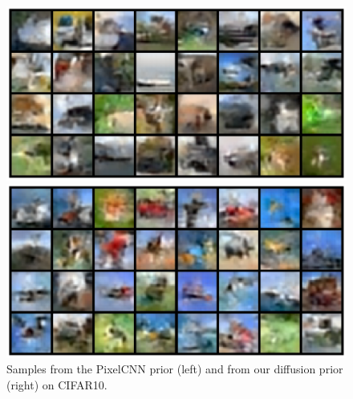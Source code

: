 \documentclass{article}
\theoremstyle{plain}
\theoremstyle{definition}
\theoremstyle{remark}
\begin{document}
\begin{figure}[!htb]
    \centering
    \begin{minipage}[b]{0.4\textwidth}
    \includegraphics[width=1.\linewidth]{./samples_pixel_cifar.pdf}
    \end{minipage}
    \hfill
    \begin{minipage}[b]{0.4\textwidth}
    \includegraphics[width=1.\linewidth]{./samples_cifar.pdf}
    \end{minipage}
        \caption{Samples from the PixelCNN prior (left) and from our diffusion prior (right) on CIFAR10.}
        
    \label{fig:cifar_priors}
\end{figure}





\end{document}
